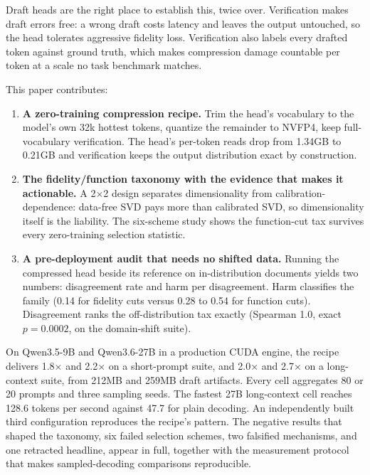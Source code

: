 \documentclass{article}
\newcommand{\x}{$\times$}
\begin{document}
Draft heads are the right place to establish this, twice over. Verification makes draft errors free: a wrong draft costs latency and leaves the output untouched, so the head tolerates aggressive fidelity loss. Verification also labels every drafted token against ground truth, which makes compression damage countable per token at a scale no task benchmark matches.

This paper contributes:

\begin{enumerate}
\item \textbf{A zero-training compression recipe.} Trim the head's vocabulary to the model's own 32k hottest tokens, quantize the remainder to NVFP4, keep full-vocabulary verification. The head's per-token reads drop from 1.34GB to 0.21GB and verification keeps the output distribution exact by construction.

\item \textbf{The fidelity/function taxonomy with the evidence that makes it actionable.} A 2$\times$2 design separates dimensionality from calibration-dependence: data-free SVD pays more than calibrated SVD, so dimensionality itself is the liability. The six-scheme study shows the function-cut tax survives every zero-training selection statistic.

\item \textbf{A pre-deployment audit that needs no shifted data.} Running the compressed head beside its reference on in-distribution documents yields two numbers: disagreement rate and harm per disagreement. Harm classifies the family (0.14 for fidelity cuts versus 0.28 to 0.54 for function cuts). Disagreement ranks the off-distribution tax exactly (Spearman 1.0, exact $p = 0.0002$, on the domain-shift suite).
\end{enumerate}

On Qwen3.5-9B and Qwen3.6-27B in a production CUDA engine, the recipe delivers 1.8\x{} and 2.2\x{} on a short-prompt suite, and 2.0\x{} and 2.7\x{} on a long-context suite, from 212MB and 259MB draft artifacts. Every cell aggregates 80 or 20 prompts and three sampling seeds. The fastest 27B long-context cell reaches 128.6 tokens per second against 47.7 for plain decoding. An independently built third configuration reproduces the recipe's pattern. The negative results that shaped the taxonomy, six failed selection schemes, two falsified mechanisms, and one retracted headline, appear in full, together with the measurement protocol that makes sampled-decoding comparisons reproducible.
\end{document}
